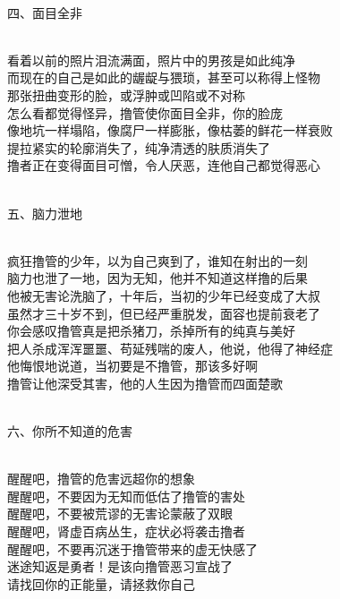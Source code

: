 \begin{poem}
\begin{adjustwidth}{-4em}{-4em}
\begin{multicols}{2}
\begin{center}
                ~\\

                四、面目全非

                ~\\

                看着以前的照片泪流满面，照片中的男孩是如此纯净 \\ 而现在的自己是如此的龌龊与猥琐，甚至可以称得上怪物 \\ 那张扭曲变形的脸，或浮肿或凹陷或不对称 \\ 怎么看都觉得怪异，撸管使你面目全非，你的脸庞 \\ 像地坑一样塌陷，像腐尸一样膨胀，像枯萎的鲜花一样衰败 \\ 提拉紧实的轮廓消失了，纯净清透的肤质消失了 \\ 撸者正在变得面目可憎，令人厌恶，连他自己都觉得恶心

                ~\\

                五、脑力泄地

                ~\\

                疯狂撸管的少年，以为自己爽到了，谁知在射出的一刻 \\ 脑力也泄了一地，因为无知，他并不知道这样撸的后果 \\ 他被无害论洗脑了，十年后，当初的少年已经变成了大叔 \\ 虽然才三十岁不到，但已经严重脱发，面容也提前衰老了 \\ 你会感叹撸管真是把杀猪刀，杀掉所有的纯真与美好 \\ 把人杀成浑浑噩噩、苟延残喘的废人，他说，他得了神经症 \\ 他悔恨地说道，当初要是不撸管，那该多好啊 \\ 撸管让他深受其害，他的人生因为撸管而四面楚歌

                ~\\

                六、你所不知道的危害

                ~\\

                醒醒吧，撸管的危害远超你的想象 \\ 醒醒吧，不要因为无知而低估了撸管的害处 \\ 醒醒吧，不要被荒谬的无害论蒙蔽了双眼 \\ 醒醒吧，肾虚百病丛生，症状必将袭击撸者 \\ 醒醒吧，不要再沉迷于撸管带来的虚无快感了 \\ 迷途知返是勇者！是该向撸管恶习宣战了 \\ 请找回你的正能量，请拯救你自己


\end{center}
\end{multicols}
\end{adjustwidth}
\end{poem}
